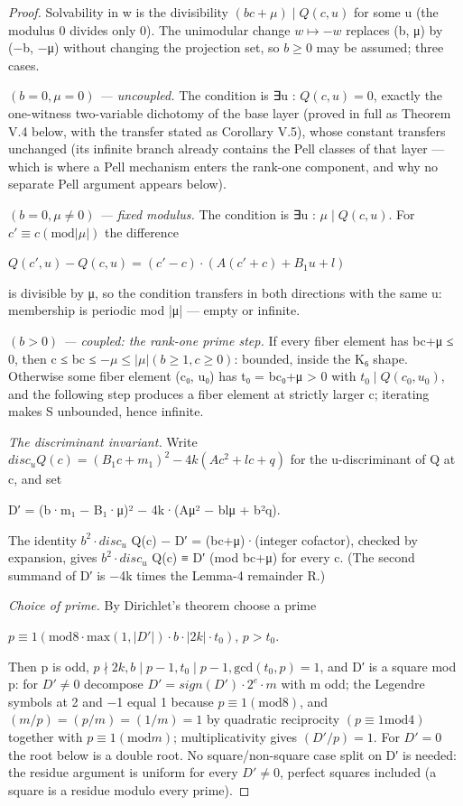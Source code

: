 \begin{proof}
Solvability in w is the divisibility $(bc+μ) ∣ Q(c,u)$ for some u (the modulus 0 divides only 0). The unimodular change $w ↦ −w$ replaces (b, μ) by (−b, −μ) without changing the projection set, so $b ≥ 0$ may be assumed; three cases.

\emph{$(b = 0, μ = 0)$ — uncoupled.} The condition is ∃u : $Q(c,u) = 0$, exactly the one-witness two-variable dichotomy of the base layer (proved in full as Theorem V.4 below, with the transfer stated as Corollary V.5), whose constant transfers unchanged (its infinite branch already contains the Pell classes of that layer — which is where a Pell mechanism enters the rank-one component, and why no separate Pell argument appears below).

\emph{$(b = 0, μ ≠ 0)$ — fixed modulus.} The condition is ∃u : $μ ∣ Q(c,u)$. For $c′ ≡ c (\mathrm{mod} |μ|)$ the difference

$Q(c′,u) − Q(c,u) = (c′−c)·(A(c′+c) + B_{1}u + l)$

is divisible by μ, so the condition transfers in both directions with the same u: membership is periodic mod |μ| — empty or infinite.

\emph{$(b > 0)$ — coupled: the rank-one prime step.} If every fiber element has bc+μ ≤ 0, then c ≤ bc ≤ $−μ ≤ |μ| (b ≥ 1, c ≥ 0)$: bounded, inside the K₆ shape. Otherwise some fiber element (c₀, u₀) has t₀ = bc₀+μ > 0 with $t_{0} ∣ Q(c_{0},u_{0})$, and the following step produces a fiber element at strictly larger c; iterating makes S unbounded, hence infinite.

\emph{The discriminant invariant.} Write $disc_{u} Q(c) = (B_{1}c+m_{1})^{2} − 4k(Ac^{2}+lc+q)$ for the u-discriminant of Q at c, and set

D′ = (b·m₁ − B₁·μ)² − 4k·(Aμ² − blμ + b²q).

The identity $b^{2}·disc_{u}$ Q(c) − D′ = (bc+μ)·(integer cofactor), checked by expansion, gives $b^{2}·disc_{u}$ Q(c) ≡ D′ (mod bc+μ) for every c. (The second summand of D′ is −4k times the Lemma-4 remainder R.)

\emph{Choice of prime.} By Dirichlet's theorem choose a prime

$p ≡ 1 (\mathrm{mod} 8·\mathrm{max}(1,|D′|)·b·|2k|·t_{0})$,   $p > t_{0}$.

Then p is odd, $p ∤ 2k, b ∣ p−1, t_{0} ∣ p−1, \mathrm{gcd}(t_{0}, p) = 1$, and D′ is a square mod p: for $D′ ≠ 0$ decompose $D′ = sign(D′)·2^{e}·m$ with m odd; the Legendre symbols at 2 and −1 equal 1 because $p ≡ 1 (\mathrm{mod} 8)$, and $(m/p) = (p/m) = (1/m) = 1$ by quadratic reciprocity $(p ≡ 1 \mathrm{mod} 4)$ together with $p ≡ 1 (\mathrm{mod} m)$; multiplicativity gives $(D′/p) = 1$. For $D′ = 0$ the root below is a double root. No square/non-square case split on D′ is needed: the residue argument is uniform for every $D′ ≠ 0$, perfect squares included (a square is a residue modulo every prime).


\end{proof}
